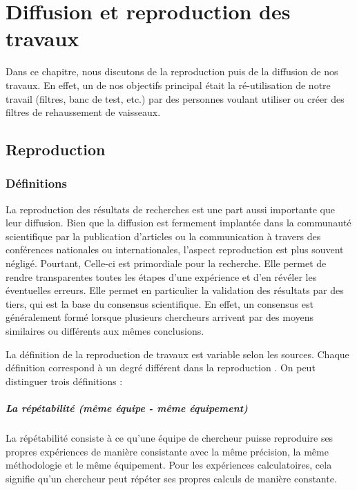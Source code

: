 \chapter{Diffusion et reproduction des travaux}


Dans ce chapitre, nous discutons de la reproduction puis de la diffusion de nos travaux. En effet, un de nos objectifs principal était la ré-utilisation de notre travail (filtres, banc de test, etc.) par des personnes voulant utiliser ou créer des filtres de rehaussement de vaisseaux.

\section{Reproduction}
\subsection{Définitions}

La reproduction des résultats de recherches est une part aussi importante que leur diffusion. Bien que la diffusion est fermement implantée dans la communauté scientifique par la publication d'articles ou la communication à travers des conférences nationales ou internationales, l'aspect reproduction est plus souvent négligé. Pourtant, Celle-ci est primordiale pour la recherche. Elle permet de rendre transparentes toutes les étapes d'une expérience et d'en révéler les éventuelles erreurs. Elle permet en particulier la validation des résultats par des tiers, qui est la base du consensus scientifique. En effet, un consensus est généralement formé lorsque plusieurs chercheurs arrivent par des moyens similaires ou différents aux mêmes conclusions.

La définition de la reproduction de travaux est variable selon les sources. Chaque définition correspond à un degré différent dans la reproduction  \cite{ACMReproDef2016}. On peut distinguer trois définitions : 

\paragraph{La répétabilité (même équipe - même équipement)}

La répétabilité consiste à ce qu'une équipe de chercheur puisse reproduire ses propres expériences de manière consistante avec la même précision, la même méthodologie et le même équipement. Pour les expériences calculatoires, cela signifie qu'un chercheur peut répéter ses propres calculs de manière constante.


